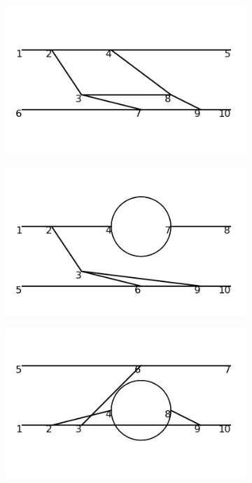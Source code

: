 \documentclass[11pt,a4paper,twoside,pdf]{article}
\numberwithin{equation}{section}
\begin{document}
\begin{figure}[h!]
    \hfill
    \begin{subfigure}[t]{0.16\textwidth}
        \centering
        \includegraphics[width=\textwidth]{plots/order6_2to2/3.png}
    \end{subfigure}
    \hfill
    \begin{subfigure}[t]{0.16\textwidth}
        \centering
        \includegraphics[width=\textwidth]{plots/order6_2to2/4.png}
    \end{subfigure}
    \hfill
    \begin{subfigure}[t]{0.16\textwidth}
        \centering
        \includegraphics[width=\textwidth]{plots/order6_2to2/5.png}

\end{subfigure}
\end{figure}
\end{document}
